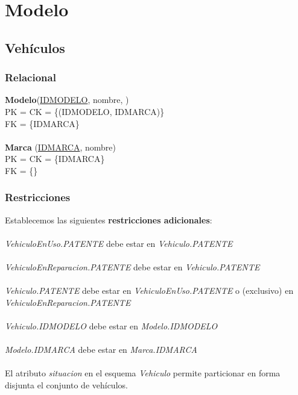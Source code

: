 \section{Modelo}


\subsection{Veh\'iculos}
\subsubsection{Relacional}




\textbf{Modelo}(\underline{IDMODELO}, nombre, )
\\
PK = CK = \{(IDMODELO, IDMARCA)\} \\
FK = \{IDMARCA\} \\
\\
\textbf{Marca} (\underline{IDMARCA}, nombre) \\
PK = CK = \{IDMARCA\} \\
FK = \{\} \\
\subsubsection{Restricciones}
Establecemos las siguientes \textbf{restricciones adicionales}:
\\
\\
\textit{VehiculoEnUso.PATENTE} debe estar en \textit{Vehiculo.PATENTE}
\\
\\
\textit{VehiculoEnReparacion.PATENTE} debe estar en \textit{Vehiculo.PATENTE}
\\
\\
\textit{Vehiculo.PATENTE} debe estar en \textit{VehiculoEnUso.PATENTE} o
(exclusivo) en \textit{VehiculoEnReparacion.PATENTE}
\\
\\
\textit{Vehiculo.IDMODELO} debe estar en \textit{Modelo.IDMODELO}
\\
\\
\textit{Modelo.IDMARCA} debe estar en \textit{Marca.IDMARCA}
\\
\\
El atributo \textit{situacion} en el esquema \textit{Vehiculo} permite
particionar en forma disjunta el conjunto de veh\'iculos.
\\
\\
